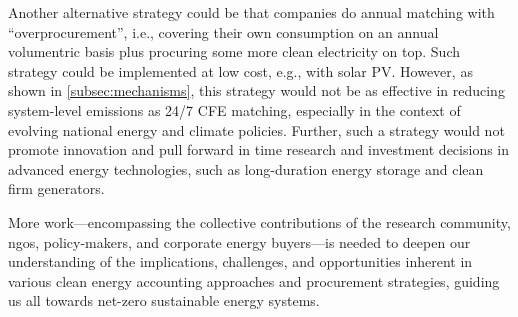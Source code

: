 Another alternative strategy could be that companies do annual matching with \enquote{overprocurement}, i.e., covering their own consumption on an annual volumentric basis plus procuring some more clean electricity on top. Such strategy could be implemented at low cost, e.g., with solar PV. 
However, as shown in \cref{subsec:mechanisms}, this strategy would not be as effective in reducing system-level emissions as 24/7 CFE matching, especially in the context of evolving national energy and climate policies.  
Further, such a strategy would not promote innovation and pull forward in time research and investment decisions in advanced energy technologies, such as long-duration energy storage and clean firm generators.

More work---encompassing the collective contributions of the research community, \gls{ngo}s, policy-makers, and corporate energy buyers---is needed to deepen our understanding of the implications, challenges, and opportunities inherent in various clean energy accounting approaches and procurement strategies, guiding us all towards net-zero sustainable energy systems.